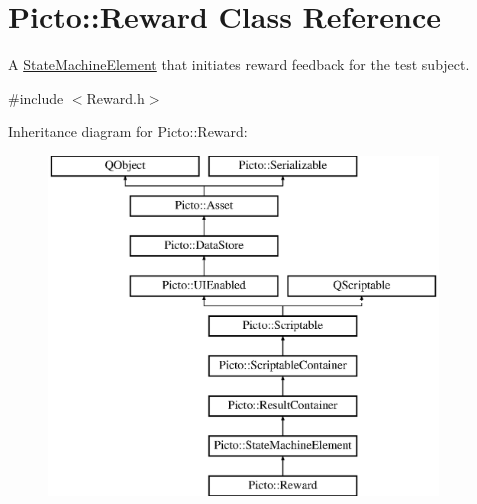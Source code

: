 \hypertarget{class_picto_1_1_reward}{\section{Picto\-:\-:Reward Class Reference}
\label{class_picto_1_1_reward}
}


A \hyperlink{class_picto_1_1_state_machine_element}{State\-Machine\-Element} that initiates reward feedback for the test subject.  




{\ttfamily \#include $<$Reward.\-h$>$}

Inheritance diagram for Picto\-:\-:Reward\-:\begin{figure}[H]
\begin{center}
\leavevmode
\includegraphics[height=9.000000cm]{class_picto_1_1_reward}
\end{center}
\end{figure}
